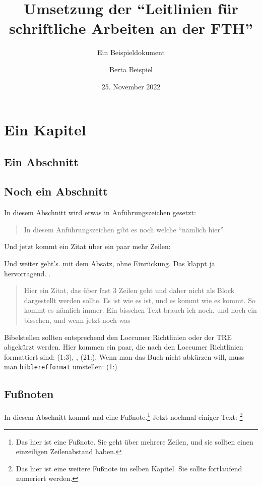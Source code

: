 \documentclass{scrreport}
\begin{document}
\title{Umsetzung der \enquote{Leitlinien für schriftliche Arbeiten an der FTH}}
\subtitle{Ein Beispieldokument}
\author{Berta Beispiel}
\date{25. November 2022}

\maketitle

\tableofcontents

\chapter{Ein Kapitel}
\section{Ein Abschnitt}
\lipsum

\section{Noch ein Abschnitt}
In diesem Abschnitt wird etwas in Anführungszeichen gesetzt: \blockquote{In diesem Anführungszeichen gibt es noch welche \enquote{nämlich hier}}. Und jetzt kommt ein Zitat über ein paar mehr Zeilen: \blockquote{\lipsum[1]} Und weiter geht's. mit dem Absatz, ohne Einrückung. Das klappt ja hervorragend. \lipsum[2]. \blockquote{Hier ein Zitat, das über fast 3 Zeilen geht und daher nicht als Block dargestellt werden sollte. Es ist wie es ist, und es kommt wie es kommt. So kommt es nämlich immer. Ein bisschen Text brauch ich noch, und noch ein bisschen, und wenn jetzt noch was}

\sloppy
Bibelstellen sollten entsprechend den Loccumer Richtlinien oder der TRE abgekürzt werden. Hier kommen ein paar, die nach den Loccumer Richtlinien formattiert sind: (1:3), , (21:). Wenn man das Buch nicht abkürzen will, muss man \texttt{biblerefformat} umstellen: { (1:)}

\fussy
\section{Fußnoten}
In diesem Abschnitt kommt mal eine Fußnote.\footnote{Das hier ist eine Fußnote. Sie geht über mehrere Zeilen, und sie sollten einen einzeiligen Zeilenabstand haben. \lipsum[1]} Jetzt nochmal einiger Text: \lipsum[1-9]\footnote{Das hier ist eine weitere Fußnote im selben Kapitel. Sie sollte fortlaufend numeriert werden.}
\end{document}
